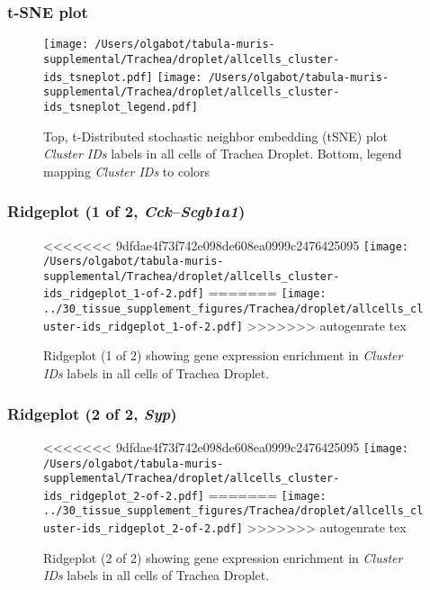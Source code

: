 \clearpage
\subsubsection{t-SNE plot}
\begin{figure}[h]
\centering
\texttt{[image: /Users/olgabot/tabula-muris-supplemental/Trachea/droplet/allcells\_cluster-ids\_tsneplot.pdf]}
\texttt{[image: /Users/olgabot/tabula-muris-supplemental/Trachea/droplet/allcells\_cluster-ids\_tsneplot\_legend.pdf]}
\caption{Top, t-Distributed stochastic neighbor embedding (tSNE) plot  \emph{Cluster IDs} labels in all cells of Trachea Droplet. Bottom, legend mapping \emph{Cluster IDs} to colors}
\end{figure}


\clearpage

\subsubsection{Ridgeplot (1 of 2, \emph{Cck}--\emph{Scgb1a1})}
\begin{figure}[h]
\centering
<<<<<<< 9dfdae4f73f742e098de608ea0999c2476425095
\texttt{[image: /Users/olgabot/tabula-muris-supplemental/Trachea/droplet/allcells\_cluster-ids\_ridgeplot\_1-of-2.pdf]}
=======
\texttt{[image: ../30\_tissue\_supplement\_figures/Trachea/droplet/allcells\_cluster-ids\_ridgeplot\_1-of-2.pdf]}
>>>>>>> autogenrate tex

\caption{ Ridgeplot (1 of 2)  showing gene expression enrichment in \emph{Cluster IDs} labels in all cells of Trachea Droplet. }
\end{figure}


\clearpage

\subsubsection{Ridgeplot (2 of 2, \emph{Syp})}
\begin{figure}[h]
\centering
<<<<<<< 9dfdae4f73f742e098de608ea0999c2476425095
\texttt{[image: /Users/olgabot/tabula-muris-supplemental/Trachea/droplet/allcells\_cluster-ids\_ridgeplot\_2-of-2.pdf]}
=======
\texttt{[image: ../30\_tissue\_supplement\_figures/Trachea/droplet/allcells\_cluster-ids\_ridgeplot\_2-of-2.pdf]}
>>>>>>> autogenrate tex

\caption{ Ridgeplot (2 of 2)  showing gene expression enrichment in \emph{Cluster IDs} labels in all cells of Trachea Droplet. }
\end{figure}


